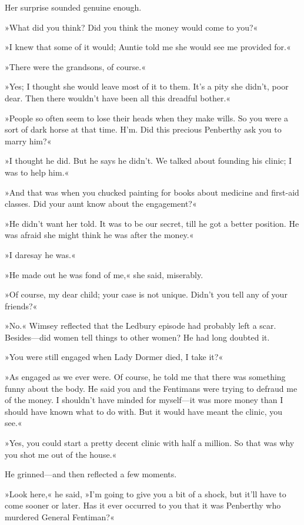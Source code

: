 Her surprise sounded genuine enough.

»What did you think? Did you think the money would come to you?«

»I knew that some of it would; Auntie told me she would see me provided for.«

»There were the grandsons, of course.«

»Yes; I thought she would leave most of it to them. It's a pity she didn't, poor dear. Then there wouldn't have been all this dreadful bother.«

»People so often seem to lose their heads when they make wills. So you were a sort of dark horse at that time. H'm. Did this precious Penberthy ask you to marry him?«

»I thought he did. But he says he didn't. We talked about founding his clinic; I was to help him.«

»And that was when you chucked painting for books about medicine and first-aid classes. Did your aunt know about the engagement?«

»He didn't want her told. It was to be our secret, till he got a better position. He was afraid she might think he was after the money.«

»I daresay he was.«

»He made out he was fond of me,« she said, miserably.

»Of course, my dear child; your case is not unique. Didn't you tell any of your friends?«

»No.« Wimsey reflected that the Ledbury episode had probably left a scar. Besides\allowbreak---\allowbreak did women tell things to other women? He had long doubted it.

»You were still engaged when Lady Dormer died, I take it?«

»As engaged as we ever were. Of course, he told me that there was something funny about the body. He said you and the Fentimans were trying to defraud me of the money. I shouldn't have minded for myself\allowbreak---\allowbreak it was more money than I should have known what to do with. But it would have meant the clinic, you see.«

»Yes, you could start a pretty decent clinic with half a million. So that was why you shot me out of the house.«

He grinned\allowbreak---\allowbreak and then reflected a few moments.

»Look here,« he said, »I'm going to give you a bit of a shock, but it'll have to come sooner or later. Has it ever occurred to you that it was Penberthy who murdered General Fentiman?«

